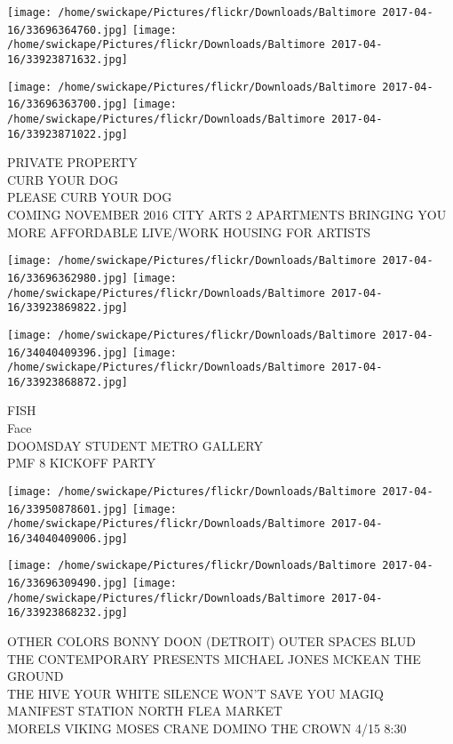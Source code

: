 \documentclass[10pt,letterpaper]{article}
\begin{document}
\texttt{[image: /home/swickape/Pictures/flickr/Downloads/Baltimore 2017-04-16/33696364760.jpg]}
\texttt{[image: /home/swickape/Pictures/flickr/Downloads/Baltimore 2017-04-16/33923871632.jpg]}

\texttt{[image: /home/swickape/Pictures/flickr/Downloads/Baltimore 2017-04-16/33696363700.jpg]}
\texttt{[image: /home/swickape/Pictures/flickr/Downloads/Baltimore 2017-04-16/33923871022.jpg]}

PRIVATE PROPERTY\\
CURB YOUR DOG\\
PLEASE CURB YOUR DOG\\
COMING NOVEMBER 2016 CITY ARTS 2 APARTMENTS BRINGING YOU MORE AFFORDABLE LIVE/WORK HOUSING FOR ARTISTS\\
\pagebreak

\texttt{[image: /home/swickape/Pictures/flickr/Downloads/Baltimore 2017-04-16/33696362980.jpg]}
\texttt{[image: /home/swickape/Pictures/flickr/Downloads/Baltimore 2017-04-16/33923869822.jpg]}

\texttt{[image: /home/swickape/Pictures/flickr/Downloads/Baltimore 2017-04-16/34040409396.jpg]}
\texttt{[image: /home/swickape/Pictures/flickr/Downloads/Baltimore 2017-04-16/33923868872.jpg]}

FISH\\
Face\\
DOOMSDAY STUDENT METRO GALLERY\\
PMF 8 KICKOFF PARTY\\
\pagebreak

\texttt{[image: /home/swickape/Pictures/flickr/Downloads/Baltimore 2017-04-16/33950878601.jpg]}
\texttt{[image: /home/swickape/Pictures/flickr/Downloads/Baltimore 2017-04-16/34040409006.jpg]}

\texttt{[image: /home/swickape/Pictures/flickr/Downloads/Baltimore 2017-04-16/33696309490.jpg]}
\texttt{[image: /home/swickape/Pictures/flickr/Downloads/Baltimore 2017-04-16/33923868232.jpg]}

OTHER COLORS BONNY DOON (DETROIT) OUTER SPACES BLUD\\
THE CONTEMPORARY PRESENTS MICHAEL JONES MCKEAN THE GROUND\\
THE HIVE YOUR WHITE SILENCE WON'T SAVE YOU MAGIQ MANIFEST STATION NORTH FLEA MARKET\\
MORELS VIKING MOSES CRANE DOMINO THE CROWN 4/15 8:30\\
\pagebreak
\end{document}
